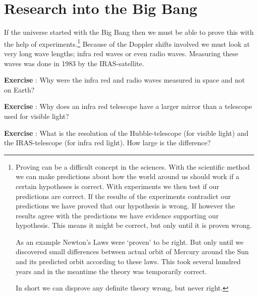 \documentclass[12pt,a4paper]{article}
\numberwithin{equation}{section}
\numberwithin{figure}{section}
\newcounter{Exercise}
\numberwithin{table}{section}
\begin{document}
\section{Research into the Big Bang}
If the universe started with the Big Bang then we must be able to prove this with the help of experiments.\footnote{Proving can be a difficult concept in the sciences. With the scientific method we can make predictions about how the world around us should work if a certain hypotheses is correct. With experiments we then test if our predictions are correct. If the results of the experiments contradict our predictions we have proved that our hypothesis is wrong. If however the results agree with the predictions we have evidence supporting our hypothesis. This means it might be correct, but only until it is proven wrong.

As an example Newton's Laws were `proven' to be right. But only until we discovered small differences between actual orbit of Mercury around the Sun and its predicted orbit according to these laws. This took several hundred years and in the meantime the theory was temporarily correct.

In short we can disprove any definite theory wrong, but never right.} Because of the Doppler shifts involved we must look at very long wave lengths; infra red waves or even radio waves. Measuring these waves was done in 1983 by the IRAS-satellite. 

\begin{shaded}
\textbf{Exercise \theExercise {}} : Why were the infra red and radio waves measured in space and not on Earth?\end{shaded}
\begin{shaded}
\textbf{Exercise \theExercise {}} : Why does an infra red telescope have a larger mirror than a telescope used for visible light?\end{shaded}
\begin{shaded}
\textbf{Exercise \theExercise {}} : What is the resolution of the Hubble-telescope (for visible light) and the IRAS-telescope (for infra red light). How large is the difference?\end{shaded}
\end{document}
